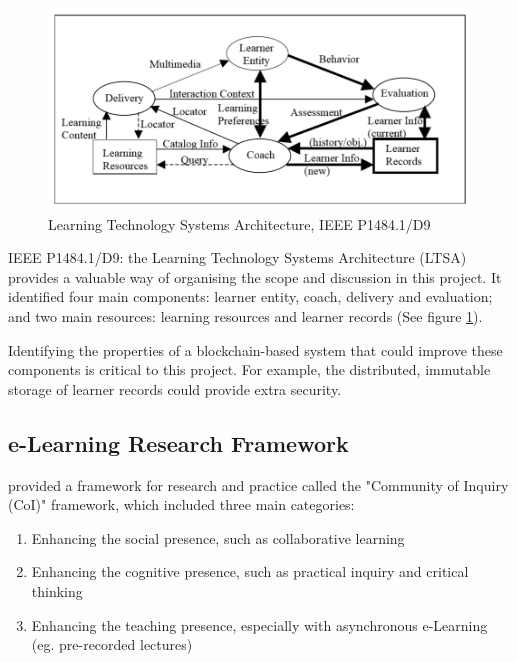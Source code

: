 \begin{figure}[!ht] 
    \centering    
    \includegraphics[width=1.0\textwidth]{LTSA}
    \caption[Learning Technology Systems Architecture]
        {Learning Technology Systems Architecture, IEEE P1484.1/D9 \citep{farance1999learning}}
    \label{fig:LTSA}
\end{figure}

IEEE P1484.1/D9: the Learning Technology Systems Architecture (LTSA) provides a valuable way of organising 
the scope and discussion in this project. It identified four main components: learner entity, coach, 
delivery and evaluation; and two main resources: learning resources and learner records (See figure \ref{fig:LTSA}).

Identifying the properties of a blockchain-based system that could improve these components is 
critical to this project. For example, the distributed, immutable storage of learner records could 
provide extra security.

\subsection{e-Learning Research Framework}

\citet{garrison2011learning} provided a framework for research and practice called the "Community 
of Inquiry (CoI)" framework, which included three main categories:

\begin{enumerate}
    \item Enhancing the social presence, such as collaborative learning
    \item Enhancing the cognitive presence, such as practical inquiry and critical thinking
    \item Enhancing the teaching presence, especially with asynchronous e-Learning (eg. pre-recorded lectures)
\end{enumerate}

